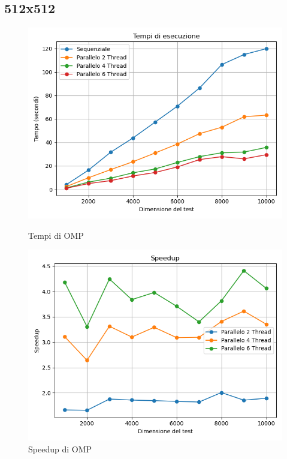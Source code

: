 \documentclass[11pt]{article}
\begin{document}
    \subsection{512x512}\label{subsec:512x512}
    \begin{figure}[H]
        \centering
        \begin{minipage}{0.49\textwidth}
            \centering
            \includegraphics[width=\textwidth]{plots/omp_times}
            \caption{Tempi di OMP}\label{fig:times-omp}
        \end{minipage}
        \begin{minipage}{0.49\textwidth}
            \centering
            \includegraphics[width=\textwidth]{plots/omp_speedup}
            \caption{Speedup di OMP}\label{fig:speedup-omp}
        \end{minipage}
    \end{figure}
\end{document}
